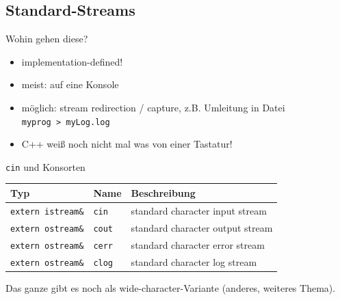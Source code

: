 \subsection{Standard-Streams}

\begin{frame}{Wohin gehen diese?}
	\begin{itemize}
		\item implementation-defined!
		\item meist: auf eine Konsole
		\item möglich: stream redirection / capture, z.B. Umleitung in Datei \texttt{myprog~>~myLog.log}
		\item C++ weiß noch nicht mal was von einer Tastatur!
	\end{itemize}
\end{frame}

\begin{frame}{\texttt{cin} und Konsorten}
	\begin{tabular}{l|l|l}
		\textbf{Typ}	&	\textbf{Name}	& \textbf{Beschreibung}	\\
		\hline
		\texttt{extern istream\&}	&	\texttt{cin}	&	standard character input stream	\\
		\texttt{extern ostream\&}	&	\texttt{cout}	&	standard character output stream	\\
		\texttt{extern ostream\&}	&	\texttt{cerr}	&	standard character error stream	\\
		\texttt{extern ostream\&}	&	\texttt{clog}	&	standard character log stream	\\
	\end{tabular}
	
	\vspace{2em}
	
	Das ganze gibt es noch als wide-character-Variante (anderes, weiteres Thema).
\end{frame}
